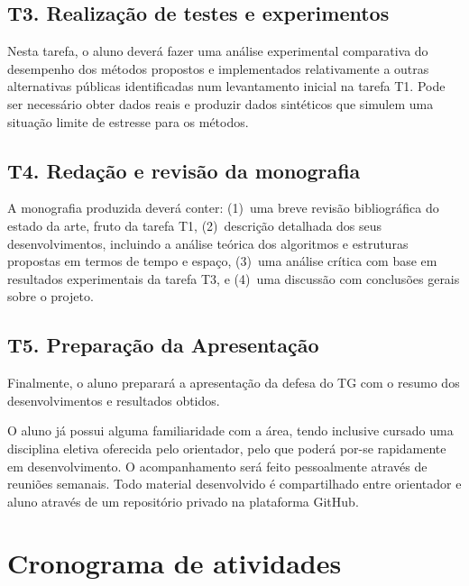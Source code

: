 \documentclass[12pt, a4paper, oneside]{article}
\begin{document}
\subsection*{T3. Realização de testes e experimentos}

Nesta tarefa, o aluno deverá fazer uma análise experimental comparativa do desempenho dos métodos propostos e implementados relativamente a outras alternativas públicas identificadas num levantamento inicial na tarefa T1. Pode ser necessário obter dados reais e produzir dados sintéticos que simulem uma situação limite de estresse para os métodos.


\subsection*{T4. Redação e revisão da monografia}

A monografia produzida deverá conter:
(1)~uma breve revisão bibliográfica do estado da arte, fruto da tarefa T1, (2)~descrição detalhada dos seus desenvolvimentos, incluindo a análise teórica dos algoritmos e estruturas propostas em termos de tempo e espaço, (3)~uma análise crítica com base em resultados experimentais da tarefa T3, e (4)~uma discussão com conclusões gerais sobre o projeto.


\subsection*{T5. Preparação da Apresentação}

Finalmente, o aluno preparará a apresentação da defesa do TG com o resumo dos desenvolvimentos e resultados obtidos.

\medskip

O aluno já possui alguma familiaridade com a área, tendo inclusive cursado uma disciplina eletiva oferecida pelo orientador, pelo que poderá por-se rapidamente em desenvolvimento. O acompanhamento será feito pessoalmente através de reuniões semanais. Todo material desenvolvido é compartilhado entre orientador e aluno através de um repositório privado na plataforma GitHub. 

\clearpage
\section{Cronograma de atividades}
\end{document}
